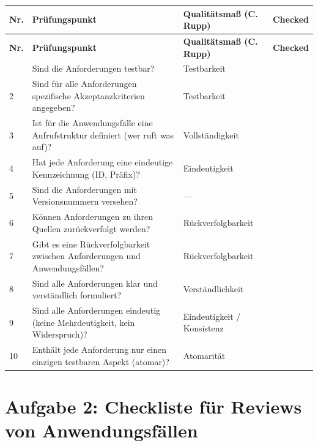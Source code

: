 \documentclass[
	fontsize=12pt,          %
	paper=a4,               %
	numbers=noenddot,       %
	listof=totoc,           %
	listof=entryprefix,     %
	listof=nochaptergap,    %
	bibliography=totoc,     %
	parskip=half,           %
	openany                 %
]{scrbook}
\begin{document}
\begin{longtable}{| p{0.65cm} | p{7.0cm} | p{3.9cm} | p{1.6cm} |}
	\hline
	\textbf{Nr.} & \textbf{Prüfungspunkt} & \textbf{Qualitätsmaß (C. Rupp)} & \textbf{Checked} \\ \hline
	\endfirsthead
	\hline
	\textbf{Nr.} & \textbf{Prüfungspunkt} & \textbf{Qualitätsmaß (C. Rupp)} & \textbf{Checked} \\ \hline
	\endhead
	\hline
	\endfoot
	1  & Sind die Anforderungen testbar? & Testbarkeit & \\ \hline
	2  & Sind für alle Anforderungen spezifische Akzeptanzkriterien angegeben? & Testbarkeit & \\ \hline
	3  & Ist für die Anwendungsfälle eine Aufrufstruktur definiert (wer ruft was auf)? & Vollständigkeit & \\ \hline
	4  & Hat jede Anforderung eine eindeutige Kennzeichnung (ID, Präfix)? & Eindeutigkeit & \\ \hline
	5  & Sind die Anforderungen mit Versionsnummern versehen? & --- & \\ \hline
	6  & Können Anforderungen zu ihren Quellen zurückverfolgt werden? & Rückverfolgbarkeit & \\ \hline
	7  & Gibt es eine Rückverfolgbarkeit zwischen Anforderungen und Anwendungsfällen? & Rückverfolgbarkeit & \\ \hline
	8  & Sind alle Anforderungen klar und verständlich formuliert? & Verständlichkeit & \\ \hline
	9  & Sind alle Anforderungen eindeutig (keine Mehrdeutigkeit, kein Widerspruch)? & Eindeutigkeit / Konsistenz & \\ \hline
	10 & Enthält jede Anforderung nur einen einzigen testbaren Aspekt (atomar)? & Atomarität & \\ \hline
\end{longtable}


\chapter*{Aufgabe 2: Checkliste für Reviews von Anwendungsfällen}
\end{document}
